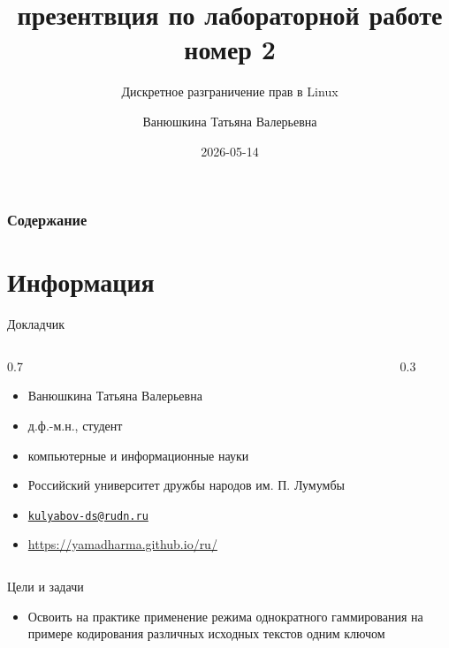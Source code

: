 \documentclass[
  ignorenonframetext,
  aspectratio=169,
]{beamer}
\title{презентвция по лабораторной работе номер 2}
\subtitle{Дискретное разграничение прав в Linux}
\author{Ванюшкина Татьяна Валерьевна}
\date{2026-05-14}
\providecommand{\tightlist}{%
  \setlength{\itemsep}{0pt}\setlength{\parskip}{0pt}}\usepackage{longtable,booktabs,array}
\renewcommand*\contentsname{Содержание}
\newcommand\contentsname{Содержание}
\begin{document}
\frame{\titlepage}

\renewcommand*\contentsname{Содержание}
\begin{frame}[allowframebreaks]
  \frametitle{Содержание}
  \tableofcontents[hideallsubsections]
\end{frame}

\section{Информация}\label{ux438ux43dux444ux43eux440ux43cux430ux446ux438ux44f}

\begin{frame}{Докладчик}
\label{ux434ux43eux43aux43bux430ux434ux447ux438ux43a}
\begin{columns}[c]
\begin{column}{0.7\textwidth}
\begin{itemize}[<+->]
\tightlist
\item
  Ванюшкина Татьяна Валерьевна
\item
  д.ф.-м.н., студент
\item
  компьютерные и информационные науки
\item
  Российский университет дружбы народов им. П. Лумумбы
\item
  \href{mailto:kulyabov-ds@rudn.ru}{\nolinkurl{kulyabov-ds@rudn.ru}}
\item
  \url{https://yamadharma.github.io/ru/}
\end{itemize}
\end{column}

\begin{column}{0.3\textwidth}
\end{column}
\end{columns}
\end{frame}

\begin{frame}{Цели и задачи}
\label{ux446ux435ux43bux438-ux438-ux437ux430ux434ux430ux447ux438}
\begin{itemize}[<+->]
\tightlist
\item
  Освоить на практике применение режима однократного гаммирования на
  примере кодирования различных исходных текстов одним ключом
\end{itemize}
\end{frame}
\end{document}
